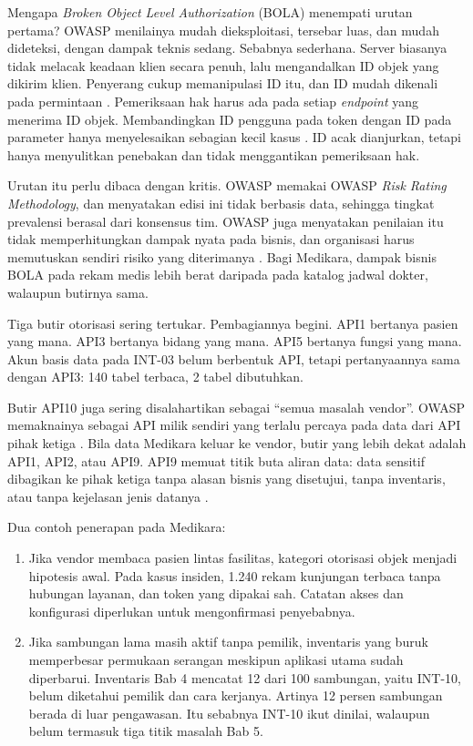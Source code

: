 Mengapa \textit{Broken Object Level Authorization} (BOLA) menempati urutan pertama? OWASP menilainya mudah dieksploitasi,
tersebar luas, dan mudah dideteksi, dengan dampak teknis sedang. Sebabnya sederhana. Server biasanya tidak melacak keadaan
klien secara penuh, lalu mengandalkan ID objek yang dikirim klien. Penyerang cukup memanipulasi ID itu, dan ID mudah dikenali
pada permintaan \cite{owasp-api1}. Pemeriksaan hak harus ada pada setiap \textit{endpoint} yang menerima ID objek. Membandingkan ID
pengguna pada token dengan ID pada parameter hanya menyelesaikan sebagian kecil kasus \cite{owasp-api1}. ID acak
dianjurkan, tetapi hanya menyulitkan penebakan dan tidak menggantikan pemeriksaan hak.

Urutan itu perlu dibaca dengan kritis. OWASP memakai OWASP \textit{Risk Rating Methodology}, dan menyatakan edisi ini tidak
berbasis data, sehingga tingkat prevalensi berasal dari konsensus tim. OWASP juga menyatakan penilaian itu tidak memperhitungkan
dampak nyata pada bisnis, dan organisasi harus memutuskan sendiri risiko yang diterimanya \cite{c06-owasp-risks}. Bagi Medikara,
dampak bisnis BOLA pada rekam medis lebih berat daripada pada katalog jadwal dokter, walaupun butirnya sama.

Tiga butir otorisasi sering tertukar. Pembagiannya begini. API1 bertanya pasien yang mana. API3 bertanya bidang yang mana.
API5 bertanya fungsi yang mana. Akun basis data pada INT-03 belum berbentuk API, tetapi pertanyaannya sama dengan API3:
140 tabel terbaca, 2 tabel dibutuhkan.

Butir API10 juga sering disalahartikan sebagai ``semua masalah vendor''. OWASP memaknainya sebagai API milik sendiri yang
terlalu percaya pada data dari API pihak ketiga \cite{c06-owasp-api10}. Bila data Medikara keluar ke vendor, butir yang lebih
dekat adalah API1, API2, atau API9. API9 memuat titik buta aliran data: data sensitif dibagikan ke pihak ketiga tanpa alasan
bisnis yang disetujui, tanpa inventaris, atau tanpa kejelasan jenis datanya \cite{owasp-api9}.

Dua contoh penerapan pada Medikara:
\begin{enumerate}
  \item Jika vendor membaca pasien lintas fasilitas, kategori otorisasi objek menjadi hipotesis awal. Pada kasus insiden,
        1.240 rekam kunjungan terbaca tanpa hubungan layanan, dan token yang dipakai sah. Catatan akses dan konfigurasi
        diperlukan untuk mengonfirmasi penyebabnya.
  \item Jika sambungan lama masih aktif tanpa pemilik, inventaris yang buruk memperbesar permukaan serangan meskipun aplikasi
        utama sudah diperbarui. Inventaris Bab 4 mencatat 12 dari 100 sambungan, yaitu INT-10, belum diketahui pemilik dan cara
        kerjanya. Artinya 12 persen sambungan berada di luar pengawasan. Itu sebabnya INT-10 ikut dinilai, walaupun belum
        termasuk tiga titik masalah Bab 5.
\end{enumerate}

